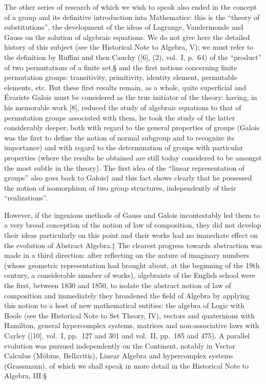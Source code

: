 The other series of research of which we wish to speak also ended in the concept of a group and its definitive introduction into Mathematics: this is the ``theory of substitutions'', the development of the ideas of Lagrange, Vandermonde and Gauss on the solution of algebraic equations. We do not give here the detailed history of this subject (see the Historical Note to Algebra, V); we must refer to the definition by Ruffini and then Cauchy ({[}6{]}, (2), vol.~I, p.~64) of the ``product'' of two permutations of a finite set,§ and the first notions concerning finite permutation groups: transitivity, primitivity, identity element, permutable elements, etc. But these first results remain, as a whole, quite superficial and Évariste Galois must be considered as the true initiator of the theory: having, in his memorable work {[}8{]}, reduced the study of algebraic equations to that of permutation groups associated with them, he took the study of the latter considerably deeper, both with regard to the general properties of groups (Galois was the first to define the notion of normal subgroup and to recognize its importance) and with regard to the determination of groups with particular properties (where the results he obtained are still today considered to be amongst the most subtle in the theory). The first idea of the ``linear representation of groups'' also goes back to Galois† and this fact shows clearly that he possessed the notion of isomorphism of two group structures, independently of their ``realizations''.

However, if the ingenious methods of Gauss and Galois incontestably led them to a very broad conception of the notion of law of composition, they did not develop their ideas particularly on this point and their works had no immediate effect on the evolution of Abstract Algebra.‡ The clearest progress towards abstraction was made in a third direction: after reflecting on the nature of imaginary numbers (whose geometric representation had brought about, at the beginning of the 19th century, a considerable number of works), algebraists of the English school were the first, between 1830 and 1850, to isolate the abstract notion of law of composition and immediately they broadened the field of Algebra by applying this notion to a host of new mathematical entities: the algebra of Logic with Boole (see the Historical Note to Set Theory, IV), vectors and quaternions with Hamilton, general hypercomplex systems, matrices and non-associative laws with Cayley ({[}10{]}, vol.~I, pp.~127 and 301 and vol.~II, pp.~185 and 475). A parallel evolution was pursued independently on the Continent, notably in Vector Calculus (Möbius, Bellavitis), Linear Algebra and hypercomplex systems (Grassmann), of which we shall speak in more detail in the Historical Note to Algebra, III.§

